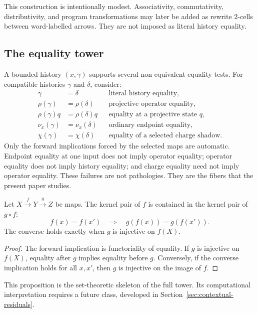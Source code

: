 This construction is intentionally modest.  Associativity, commutativity,
distributivity, and program transformations may later be added as rewrite
$2$-cells between word-labelled arrows.  They are not imposed as literal
history equality.

\subsection{The equality tower}

A bounded history $(x,\gamma)$ supports several non-equivalent equality tests.
For compatible histories $\gamma$ and $\delta$, consider:
\begin{align*}
  \gamma&=\delta &&\text{literal history equality},\\
  \rho(\gamma)&=\rho(\delta) &&\text{projective operator equality},\\
  \rho(\gamma)q&=\rho(\delta)q &&\text{equality at a projective state $q$},\\
  \nu_x(\gamma)&=\nu_x(\delta) &&\text{ordinary endpoint equality},\\
  \chi(\gamma)&=\chi(\delta) &&\text{equality of a selected charge shadow}.
\end{align*}
Only the forward implications forced by the selected maps are automatic.
Endpoint equality at one input does not imply operator equality; operator
equality does not imply history equality; and charge equality need not imply
operator equality.  These failures are not pathologies.  They are the fibers
that the present paper studies.

\begin{proposition}
Let $X\xrightarrow{f}Y\xrightarrow{g}Z$ be maps.  The kernel pair of $f$ is
contained in the kernel pair of $g\circ f$:
\[
  f(x)=f(x')\quad\Longrightarrow\quad g(f(x))=g(f(x')).
\]
The converse holds exactly when $g$ is injective on $f(X)$.
\end{proposition}
\begin{proof}
The forward implication is functoriality of equality.  If $g$ is injective on
$f(X)$, equality after $g$ implies equality before $g$.  Conversely, if the
converse implication holds for all $x,x'$, then $g$ is injective on the image
of $f$.
\end{proof}

This proposition is the set-theoretic skeleton of the full tower.  Its
computational interpretation requires a future class, developed in
Section~\ref{sec:contextual-residuals}.

